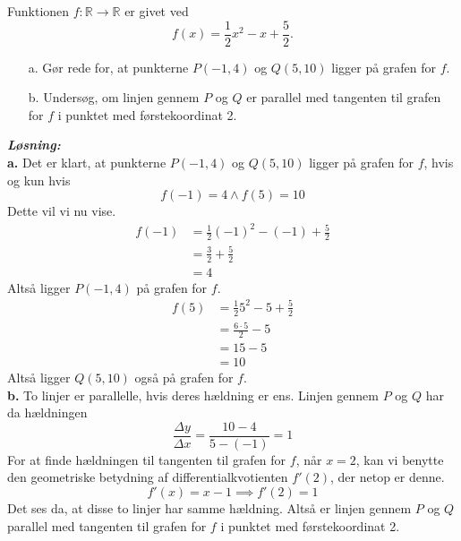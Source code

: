 \documentclass{article}
\newcommand{\sol}{\setlength{\parindent}{0cm}\textbf{\textit{Løsning:}}\setlength{\parindent}{1cm}}
\begin{document}
\begin{question}{}{}
Funktionen $f:\mathbb{R} \to \mathbb{R}$ er givet ved
\[
f(x)= \frac{1}{2}x^2 -x + \frac{5}{2}.
\] 
\begin{itemize}
  \item[a.] Gør rede for, at punkterne $P(-1,4)$ og $Q(5,10)$ ligger på grafen for $f$.
  \item[b.] Undersøg, om linjen gennem $P$ og $Q$ er parallel med tangenten til grafen for $f$ i punktet med førstekoordinat 2. 
\end{itemize}
\end{question}
\sol \\ 
\textbf{a.} Det er klart, at punkterne $P(-1,4)$ og $Q(5,10)$ ligger på grafen for $f$, hvis og kun hvis
\[
f(-1)= 4 \land f(5)= 10
\] 
Dette vil vi nu vise. 
\begin{equation*}
\begin{split}
  f(-1)&=\frac{1}{2}(-1)^2 -(-1) + \frac{5}{2} \\ 
  &= \frac{3}{2}+\frac{5}{2}\\ 
  &= 4
\end{split}
\end{equation*}
Altså ligger $P(-1,4)$ på grafen for $f$. 
\begin{equation*}
\begin{split}
  f(5)&= \frac{1}{2}5^2 -5 + \frac{5}{2} \\
  &=\frac{6\cdot5}{2}-5 \\ 
  &= 15 - 5 \\
  &= 10
\end{split}
\end{equation*}
Altså ligger $Q(5,10)$ også på grafen for $f$.\\[1ex]
\textbf{b.} To linjer er parallelle, hvis deres hældning er ens. Linjen gennem $P$ og $Q$ har da hældningen
\[
\frac{\Delta y}{\Delta x}=\frac{10-4}{5-(-1)}=1
\] 
For at finde hældningen til tangenten til grafen for $f$, når $x=2$, kan vi benytte den geometriske betydning af differentialkvotienten $f'(2)$, der netop er denne. 
\[
f'(x)= x-1 \implies f'(2)= 1
\] 
Det ses da, at disse to linjer har samme hældning. Altså er linjen gennem $P$ og $Q$ parallel med tangenten til grafen for $f$ i punktet med førstekoordinat 2. 
\end{document}
